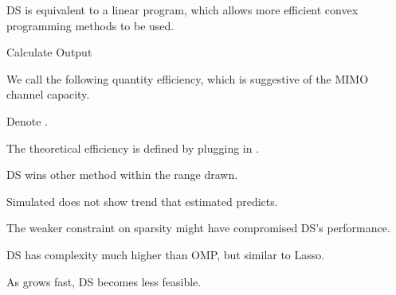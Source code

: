 {
\I DS is equivalent to a linear program, which allows more efficient convex programming methods to be used.

\I Calculate
\I Output 
}
{
\I We call the following quantity \m {\chi} efficiency, which is suggestive of the MIMO channel capacity.

\I Denote .

\I The theoretical efficiency  is defined by plugging in .
}
{
\blank [big]
}
{
\blank [big]
}
{
\blank [big]
}
{
\blank [big]
}
{
\blank [big]
}
{
\I DS wins other method within the range drawn.

\I Simulated \m {\chi} does not show trend that estimated \m {\T {\chi}} predicts.

\I The weaker constraint on sparsity might have compromised DS's performance.

\I DS has complexity much higher than OMP, but similar to Lasso.

\I As  grows fast, DS becomes less feasible.
}
